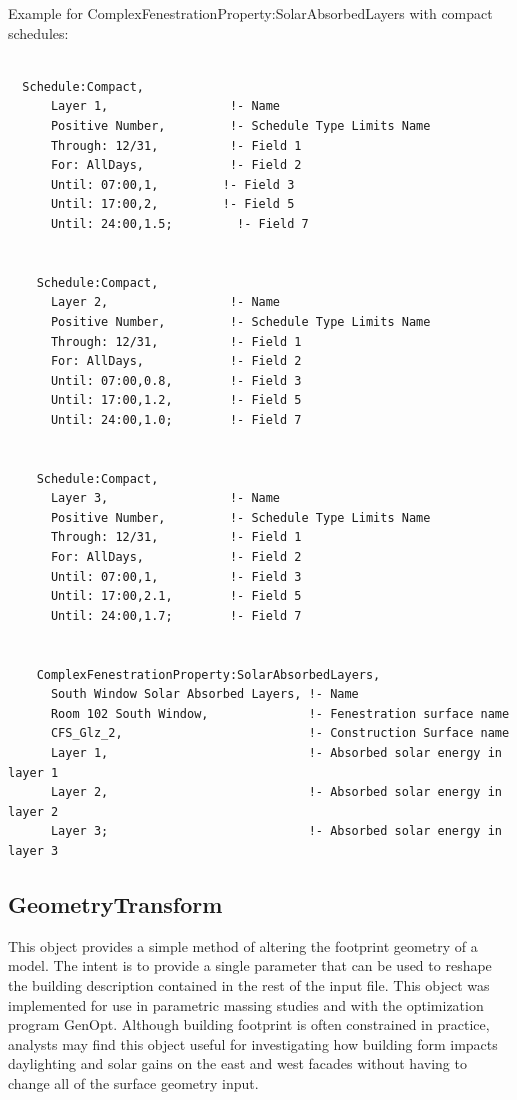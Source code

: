 Example for ComplexFenestrationProperty:SolarAbsorbedLayers with compact schedules:

\begin{lstlisting}

  Schedule:Compact,
      Layer 1,                 !- Name
      Positive Number,         !- Schedule Type Limits Name
      Through: 12/31,          !- Field 1
      For: AllDays,            !- Field 2
      Until: 07:00,1,         !- Field 3
      Until: 17:00,2,         !- Field 5
      Until: 24:00,1.5;         !- Field 7


    Schedule:Compact,
      Layer 2,                 !- Name
      Positive Number,         !- Schedule Type Limits Name
      Through: 12/31,          !- Field 1
      For: AllDays,            !- Field 2
      Until: 07:00,0.8,        !- Field 3
      Until: 17:00,1.2,        !- Field 5
      Until: 24:00,1.0;        !- Field 7


    Schedule:Compact,
      Layer 3,                 !- Name
      Positive Number,         !- Schedule Type Limits Name
      Through: 12/31,          !- Field 1
      For: AllDays,            !- Field 2
      Until: 07:00,1,          !- Field 3
      Until: 17:00,2.1,        !- Field 5
      Until: 24:00,1.7;        !- Field 7


    ComplexFenestrationProperty:SolarAbsorbedLayers,
      South Window Solar Absorbed Layers, !- Name
      Room 102 South Window,              !- Fenestration surface name
      CFS_Glz_2,                          !- Construction Surface name
      Layer 1,                            !- Absorbed solar energy in layer 1
      Layer 2,                            !- Absorbed solar energy in layer 2
      Layer 3;                            !- Absorbed solar energy in layer 3
\end{lstlisting}

\subsection{GeometryTransform}\label{geometrytransform}

This object provides a simple method of altering the footprint geometry of a model. The intent is to provide a single parameter that can be used to reshape the building description contained in the rest of the input file. This object was implemented for use in parametric massing studies and with the optimization program GenOpt. Although building footprint is often constrained in practice, analysts may find this object useful for investigating how building form impacts daylighting and solar gains on the east and west facades without having to change all of the surface geometry input.

